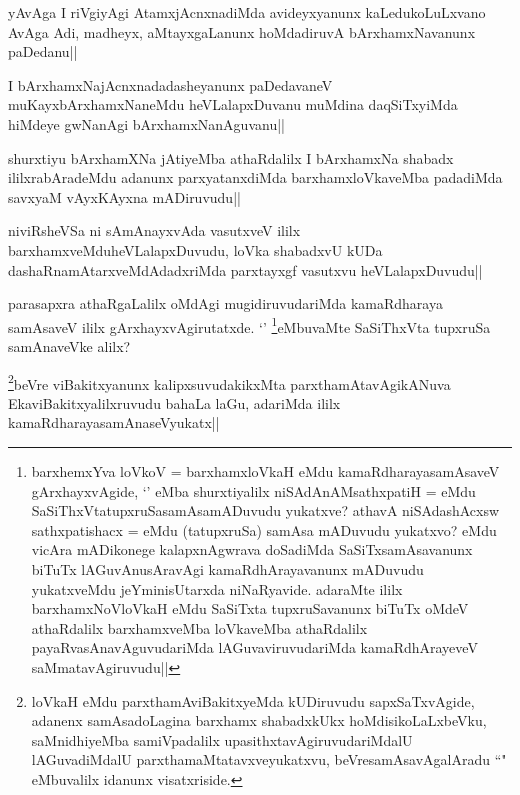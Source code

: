 \begin{artha}
yAvAga I riVgiyAgi AtamxjAcnxnadiMda avideyxyanunx kaLedukoLuLxvano AvAga Adi, madheyx, aMtayxgaLanunx hoMdadiruvA bArxhamxNavanunx paDedanu||
\end{artha}

\begin{artha}
I bArxhamxNajAcnxnadadasheyanunx paDedavaneV muKayxbArxhamxNaneMdu heVLalapxDuvanu muMdina daqSiTxyiMda hiMdeye gwNanAgi bArxhamxNanAguvanu||
\end{artha}


\begin{artha}
shurxtiyu bArxhamXNa jAtiyeMba athaRdalilx I bArxhamxNa shabadx ililxrabAradeMdu adanunx parxyatanxdiMda barxhamxloVkaveMba padadiMda savxyaM vAyxKAyxna mADiruvudu||
\end{artha}


\begin{artha}
niviRsheVSa ni sAmAnayxvAda vasutxveV ililx barxhamxveMduheVLalapxDuvudu, loVka shabadxvU kUDa dashaRnamAtarxveMdAdadxriMda parxtayxgf vasutxvu heVLalapxDuvudu||
\end{artha}



\begin{artha}
parasapxra athaRgaLalilx oMdAgi mugidiruvudariMda kamaRdharaya samAsaveV ililx gArxhayxvAgirutatxde. `\stext' \footnote{barxhemxYva loVkoV = barxhamxloVkaH eMdu kamaRdharayasamAsaveV gArxhayxvAgide, `\stext' eMba shurxtiyalilx niSAdAnAMsathxpatiH = eMdu SaSiThxVtatupxruSasamAsamADuvudu yukatxve? athavA niSAdashAcxsw sathxpatishacx = eMdu (tatupxruSa) samAsa mADuvudu yukatxvo? eMdu vicAra mADikonege kalapxnAgwrava doSadiMda SaSiTxsamAsavanunx biTuTx lAGuvAnusAravAgi kamaRdhArayavanunx mADuvudu yukatxveMdu jeYminisUtarxda niNaRyavide. adaraMte ililx barxhamxNoVloVkaH eMdu SaSiTxta tupxruSavanunx biTuTx oMdeV athaRdalilx barxhamxveMba loVkaveMba athaRdalilx payaRvasAnavAguvudariMda lAGuvaviruvudariMda kamaRdhArayeveV saMmatavAgiruvudu||}eMbuvaMte SaSiThxVta tupxruSa samAnaveVke alilx?
\end{artha}

\begin{artha}
\footnote{loVkaH eMdu parxthamAviBakitxyeMda kUDiruvudu sapxSaTxvAgide, adanenx samAsadoLagina barxhamx shabadxkUkx hoMdisikoLaLxbeVku, saMnidhiyeMba samiVpadalilx upasithxtavAgiruvudariMdalU lAGuvadiMdalU parxthamaMtatavxveyukatxvu, beVresamAsavAgalAradu ``\stext" eMbuvalilx idanunx visatxriside.}beVre viBakitxyanunx kalipxsuvudakikxMta parxthamAtavAgikANuva EkaviBakitxyalilxruvudu bahaLa laGu, adariMda ililx kamaRdharayasamAnaseVyukatx||
\end{artha}

